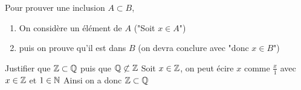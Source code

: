 \documentclass[11pt]{article}
\begin{document}
\begin{meth*}{}{}
    Pour prouver une inclusion $A \subset B$,
    \begin{enumerate}
        \item On considère un élément de $A$ ("Soit $x \in A$")
        \item puis on prouve qu'il est dans $B$ (on devra conclure avec "donc $x \in B$")
    \end{enumerate}
\end{meth*}

\begin{ex}{}{}
    Justifier que $\mathbb{Z} \subset \mathbb{Q}$ puis que $\mathbb{Q} \not \subset \mathbb{Z}$
    \tcblower
    Soit $x \in \mathbb{Z}$, on peut écire $x$ comme $\frac{x}{1}$ avec $x \in \mathbb{Z}$ et $1 \in \mathbb{N}$\n
    Ainsi on a donc $\mathbb{Z} \subset \mathbb{Q}$
\end{ex}
\end{document}
